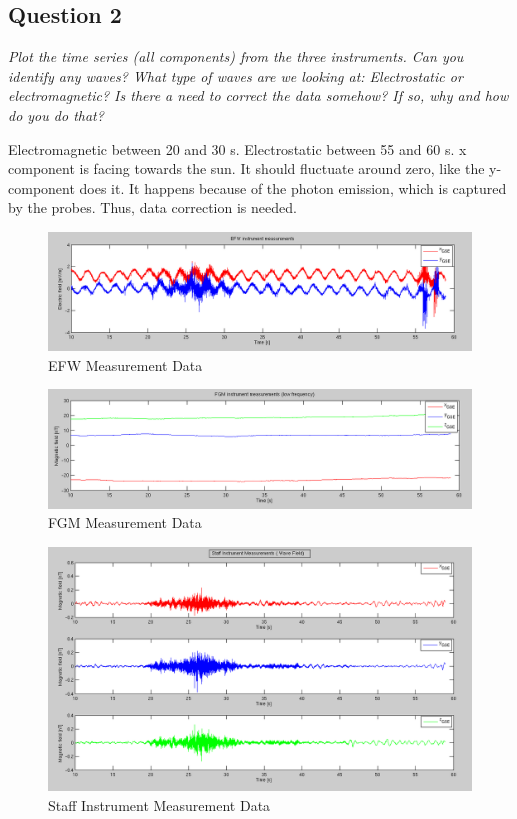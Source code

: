 \documentclass{article}
\begin{document}
\subsection{Question 2}
\textit{Plot the time series (all components) from the three instruments. Can you identify any waves? What type of waves are we looking at: Electrostatic or electromagnetic? Is there a need to correct the data somehow? If so, why and how do you do that?}

Electromagnetic between 20 and 30 s. Electrostatic between 55 and 60 s. x component is facing towards the sun. It should fluctuate around zero, like the y-component does it. It happens because of the photon emission, which is captured by the probes. Thus, data correction is needed.

\begin{figure}[htb]
\centering
\includegraphics[width=\textwidth]{Figures/EFW_measurement.png}
\caption{EFW Measurement Data}
\label{fig:EFW}
\end{figure}

\begin{figure}[htb]
\centering
\includegraphics[width=\textwidth]{Figures/FGM_measurement.png}
\caption{FGM Measurement Data}
\label{fig:FGM}
\end{figure}

\begin{figure}[htb!]
\centering
\includegraphics[width=\textwidth]{Figures/Staff_measurement.png}
\caption{Staff Instrument Measurement Data}
\label{fig:Staff}
\end{figure}
\end{document}
